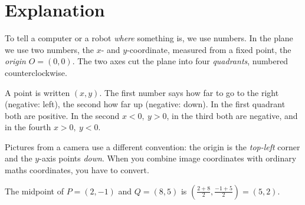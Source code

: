 \label{ch:coordinates}

\section*{Explanation}
To tell a computer or a robot \emph{where} something is, we use numbers. In the plane we use two numbers, the $x$- and $y$-coordinate, measured from a fixed point, the \emph{origin} $O=(0,0)$. The two axes cut the plane into four \emph{quadrants}, numbered counterclockwise.

\begin{center}

\label{fig:b2_1}
\end{center}

A point is written $(x,y)$. The first number says how far to go to the right (negative: left), the second how far up (negative: down). In the first quadrant both are positive. In the second $x<0,\ y>0$, in the third both are negative, and in the fourth $x>0,\ y<0$.

\begin{keyidea}
Pictures from a camera use a different convention: the origin is the \emph{top-left} corner and the $y$-axis points \emph{down}. When you combine image coordinates with ordinary maths coordinates, you have to convert.
\end{keyidea}

\begin{example}[Midpoint]
The midpoint of $P=(2,-1)$ and $Q=(8,5)$ is $\left(\frac{2+8}{2},\frac{-1+5}{2}\right)=(5,2)$.
\end{example}

